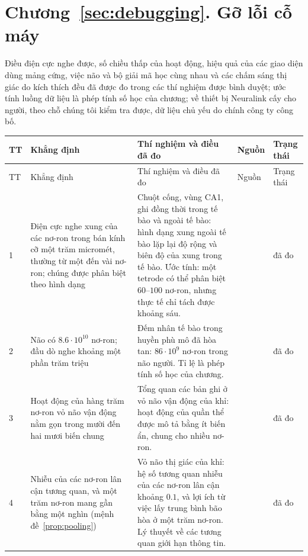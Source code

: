 \section{Chương~\ref{sec:debugging}. Gỡ lỗi cỗ máy}

Điều điện cực nghe được, số chiều thấp của hoạt động, hiệu quả của các giao diện dùng mảng cứng, việc não và bộ giải mã học cùng nhau và các chấm sáng thị giác do kích thích đều đã được đo trong các thí nghiệm được bình duyệt; ước tính luồng dữ liệu là phép tính số học của chương; về thiết bị Neuralink cấy cho người, theo chỗ chúng tôi kiểm tra được, dữ liệu chủ yếu do chính công ty công bố.

{\footnotesize
\setlength{\tabcolsep}{3pt}\renewcommand{\arraystretch}{1.15}
\begin{longtable}{>{\raggedright}p{0.5cm}>{\raggedright}p{4.0cm}>{\raggedright}p{5.6cm}>{\raggedright}p{2.3cm}>{\raggedright\arraybackslash}p{1.7cm}}
\toprule
TT & Khẳng định & Thí nghiệm và điều đã đo & Nguồn & Trạng thái \\
\midrule\endfirsthead
\toprule
TT & Khẳng định & Thí nghiệm và điều đã đo & Nguồn & Trạng thái \\
\midrule\endhead
1 & Điện cực nghe xung của các nơ-ron trong bán kính cỡ một trăm micromét, thường từ một đến vài nơ-ron; chúng được phân biệt theo hình dạng & Chuột cống, vùng CA1, ghi đồng thời trong tế bào và ngoài tế bào: hình dạng xung ngoài tế bào lặp lại độ rộng và biên độ của xung trong tế bào. Ước tính: một tetrode có thể phân biệt $60$--$100$ nơ-ron, nhưng thực tế chỉ tách được khoảng sáu. & \cite{Henze2000extra} & đã đo \\
2 & Não có $8.6\cdot10^{10}$ nơ-ron; đầu dò nghe khoảng một phần trăm triệu & Đếm nhân tế bào trong huyền phù mô đã hòa tan: $86\cdot10^9$ nơ-ron trong não người. Tỉ lệ là phép tính số học của chương. & \cite{Azevedo2009} & đã đo \\
3 & Hoạt động của hàng trăm nơ-ron vỏ não vận động nằm gọn trong mười đến hai mươi biến chung & Tổng quan các bản ghi ở vỏ não vận động của khỉ: hoạt động của quần thể được mô tả bằng ít biến ẩn, chung cho nhiều nơ-ron. & \cite{Gallego2017} & đã đo \\
4 & Nhiễu của các nơ-ron lân cận tương quan, và một trăm nơ-ron mang gần bằng một nghìn (mệnh đề~\ref{prop:pooling}) & Vỏ não thị giác của khỉ: hệ số tương quan nhiễu của các nơ-ron lân cận khoảng $0.1$, và lợi ích từ việc lấy trung bình bão hòa ở một trăm nơ-ron. Lý thuyết về các tương quan giới hạn thông tin. & \cite{Zohary1994, MorenoBote2014} & đã đo \\

\end{longtable}}
